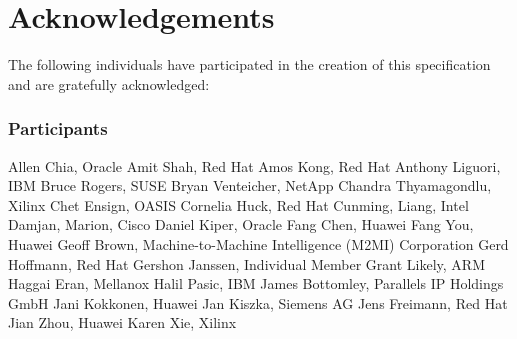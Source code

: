 \chapter{Acknowledgements}\label{chap:Acknowledgements}

The following individuals have participated in the creation of this specification and are gratefully acknowledged:

\subsection*{Participants}
Allen Chia, Oracle	\newline
Amit Shah,	Red Hat	\newline
Amos Kong,	Red Hat	\newline
Anthony Liguori,	IBM	\newline
Bruce Rogers, SUSE	\newline
Bryan Venteicher,	NetApp	\newline
Chandra Thyamagondlu, Xilinx	\newline
Chet Ensign, OASIS	\newline
Cornelia Huck,	Red Hat	\newline
Cunming, Liang, Intel	\newline
Damjan, Marion, Cisco	\newline
Daniel Kiper,	Oracle	\newline
Fang Chen, Huawei	\newline
Fang You, Huawei	\newline
Geoff Brown,	Machine-to-Machine Intelligence (M2MI) Corporation	\newline
Gerd Hoffmann, Red Hat	\newline
Gershon Janssen,	Individual Member	\newline
Grant Likely, ARM	\newline
Haggai Eran,	Mellanox	\newline
Halil Pasic,	IBM	\newline
James Bottomley,	Parallels IP Holdings GmbH	\newline
Jani Kokkonen, Huawei	\newline
Jan Kiszka,	Siemens AG	\newline
Jens Freimann, Red Hat	\newline
Jian Zhou,	Huawei	\newline
Karen Xie, Xilinx	\newline
